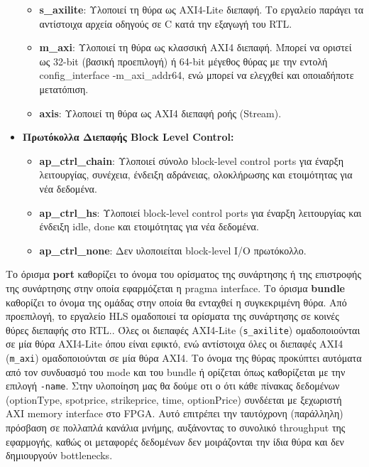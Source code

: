 \begin{itemize}
      \begin{itemize}
          \item \textbf{s\_axilite}: Υλοποιεί τη θύρα ως AXI4-Lite διεπαφή. Το εργαλείο παράγει τα αντίστοιχα αρχεία οδηγούς σε C κατά την εξαγωγή του RTL.
          \item \textbf{m\_axi}: Υλοποιεί τη θύρα ως κλασσική AXI4 διεπαφή. Μπορεί να οριστεί ως 32-bit (βασική προεπιλογή) ή 64-bit μέγεθος θύρας με την εντολή config\_interface -m\_axi\_addr64, ενώ μπορεί να ελεγχθεί και οποιαδήποτε μετατόπιση.
          \item \textbf{axis}: Υλοποιεί τη θύρα ως AXI4 διεπαφή ροής (Stream).
      \end{itemize}
  \item \textbf{Πρωτόκολλα Διεπαφής Block Level Control:}
      \begin{itemize}
          \item \textbf{ap\_ctrl\_chain}: Υλοποιεί σύνολο block-level control ports για έναρξη λειτουργίας, συνέχεια, ένδειξη αδράνειας, ολοκλήρωσης και ετοιμότητας για νέα δεδομένα.
          \item \textbf{ap\_ctrl\_hs}: Υλοποιεί block-level control ports για έναρξη λειτουργίας και ένδειξη idle, done και ετοιμότητας για νέα δεδομένα.
          \item \textbf{ap\_ctrl\_none}: Δεν υλοποιείται block-level I/O πρωτόκολλο.
      \end{itemize}
\end{itemize}

Το όρισμα \textbf{port} καθορίζει το όνομα του ορίσματος της συνάρτησης ή της επιστροφής της συνάρτησης στην οποία εφαρμόζεται η pragma interface.
Το όρισμα \textbf{bundle} καθορίζει το όνομα της ομάδας στην οποία θα ενταχθεί η συγκεκριμένη θύρα. 
Από προεπιλογή, το εργαλείο HLS ομαδοποιεί τα ορίσματα της συνάρτησης σε κοινές θύρες διεπαφής στο RTL.. 
Όλες οι διεπαφές AXI4-Lite (\texttt{s\_axilite}) ομαδοποιούνται σε μία θύρα AXI4-Lite όπου είναι εφικτό, ενώ αντίστοιχα όλες οι διεπαφές AXI4 (\texttt{m\_axi}) ομαδοποιούνται σε μία θύρα AXI4. 
Το όνομα της θύρας προκύπτει αυτόματα από τον συνδυασμό του mode και του bundle ή ορίζεται όπως καθορίζεται με την επιλογή \texttt{-name}.
Στην υλοποίηση μας θα δούμε οτι ο ότι κάθε πίνακας δεδομένων (optionType, spotprice, strikeprice, time, optionPrice) συνδέεται με ξεχωριστή AXI memory interface στο FPGA.
Αυτό επιτρέπει την ταυτόχρονη (παράλληλη) πρόσβαση σε πολλαπλά κανάλια μνήμης, αυξάνοντας το συνολικό throughput της εφαρμογής, καθώς οι μεταφορές δεδομένων δεν μοιράζονται 
την ίδια θύρα και δεν δημιουργούν bottlenecks.

